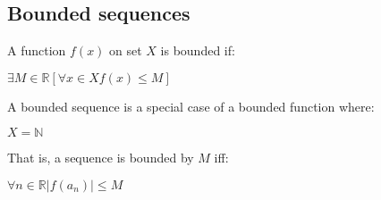 

\subsection{Bounded sequences}

A function \(f(x)\) on set \(X\) is bounded if:

\(\exists M\in \mathbb{R} [\forall x\in X f(x)\le M]\)

A bounded sequence is a special case of a bounded function where:

\(X=\mathbb{N}\)

That is, a sequence is bounded by \(M\) iff:

\(\forall n\in \mathbb{R} |f(a_n)|\le M\)

